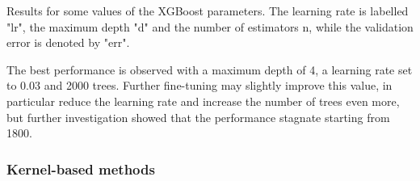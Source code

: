 \begin{table}[h!]
    \caption{Results for some values of the XGBoost parameters. The learning rate is labelled "lr", the maximum depth "d" and the number of estimators n, while the validation error is denoted by "err".}
    \label{tab:results-xgboost}
\end{table}

The best performance is observed with a maximum depth of 4, a learning rate set to 0.03 and 2000 trees. Further fine-tuning may slightly improve this value, in particular reduce the learning rate and increase the number of trees even more, but further investigation showed that the performance stagnate starting from 1800.


\subsubsection{Kernel-based methods\label{section:kernel-methods}}

